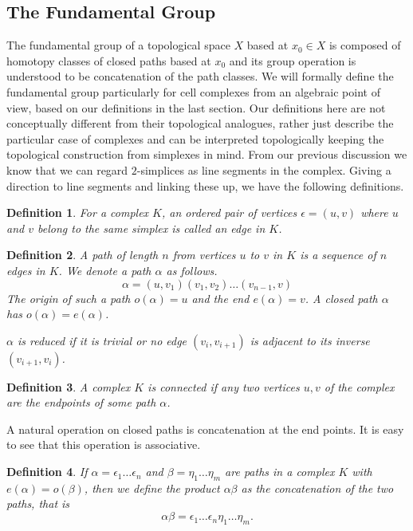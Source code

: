\documentclass[12pt]{article}
\newtheorem{definition}{Definition}
\theoremstyle{definition}
\numberwithin{equation}{theorem}
\begin{document}
\subsection{The Fundamental Group}
\label{sec:sc:path}

The fundamental group of a topological space $X$ based at $x_0 \in X$ is composed of homotopy classes of closed paths based at $x_0$ and its group operation is understood to be concatenation of the path classes. We will formally define the fundamental group particularly for cell complexes from an algebraic point of view, based on our definitions in the last section. Our definitions here are not conceptually different from their topological analogues, rather just describe the particular case of complexes and can be interpreted topologically keeping the topological construction from simplexes in mind. From our previous discussion we know that we can regard $2$-simplices as line segments in the complex. Giving a direction to line segments and linking these up, we have the following definitions.

\begin{definition}
  For a complex $K$, an ordered pair of vertices $\epsilon = (u,v)$ where $u$ and $v$ belong to the same simplex is called an \emph{edge} in $K$.
\end{definition}

\begin{definition}
  A \emph{path} of length $n$ from vertices $u$ to $v$ in $K$ is a sequence of $n$ edges in $K$. We denote a path $\alpha$ as follows.
  \[
    \alpha = (u,v_1)(v_1,v_2) \dots (v_{n-1},v)
  \]
  The \emph{origin} of such a path $o(\alpha) = u$ and the \emph{end} $e(\alpha) = v$. A \emph{closed} path $\alpha$ has $o(\alpha) = e(\alpha)$.

  $\alpha$ is \emph{reduced} if it is trivial or no edge $(v_i,v_{i+1})$ is adjacent to its inverse $(v_{i+1},v_i)$.
\end{definition}

\begin{definition}
  A complex $K$ is \emph{connected} if any two vertices $u,v$ of the complex are the endpoints of some path $\alpha$.
\end{definition}


A natural operation on closed paths is concatenation at the end points. It is easy to see that this operation is associative.

\begin{definition}
  If $\alpha = \epsilon_1 \dots \epsilon_n$ and $\beta = \eta_1 \dots \eta_m$ are paths in a complex $K$ with $e(\alpha) = o(\beta)$, then we define the \emph{product} $\alpha\beta$ as the concatenation of the two paths, that is
  \[
    \alpha\beta = \epsilon_1 \dots \epsilon_n\eta_1 \dots \eta_m.
  \]
\end{definition}
\end{document}

